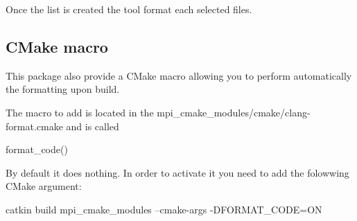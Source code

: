 Once the list is created the tool format each selected files.

\subsection*{C\+Make macro}

This package also provide a C\+Make macro allowing you to perform automatically the formatting upon build.

The macro to add is located in the {\ttfamily mpi\+\_\+cmake\+\_\+modules/cmake/clang-\/format.\+cmake} and is called \begin{DoxyVerb}format_code()
\end{DoxyVerb}


By default it does nothing. In order to activate it you need to add the folowwing C\+Make argument\+: \begin{DoxyVerb}catkin build mpi_cmake_modules --cmake-args -DFORMAT_CODE=ON \end{DoxyVerb}
 